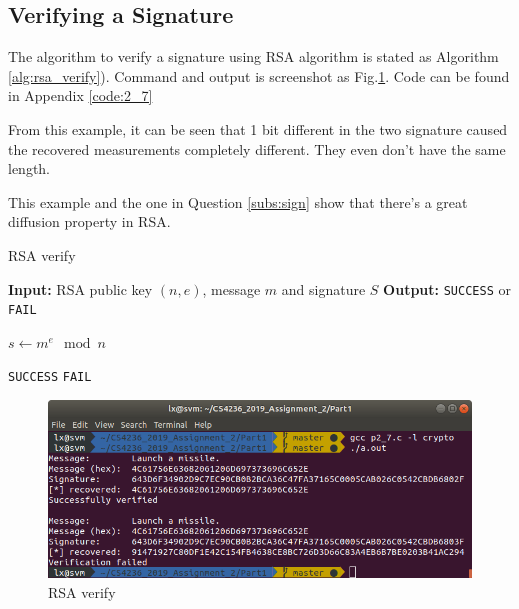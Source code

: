\subsection{Verifying a Signature}

The algorithm to verify a signature using RSA algorithm is stated as Algorithm \ref{alg:rsa_verify}).
Command and output is screenshot as Fig.\ref{fig:p2_7}.
Code can be found in Appendix \ref{code:2_7}

From this example, it can be seen that 1 bit different in the two signature caused the recovered measurements completely different. They even don't have the same length.

This example and the one in Question \ref{subs:sign} show that there's a great diffusion property in RSA.

\begin{algorithm}
\caption{RSA verify}
\label{alg:rsa_verify}
\begin{algorithmic}
\STATE \textbf{Input:} RSA public key $(n, e)$, message $m$ and signature $S$
\STATE \textbf{Output:} \texttt{SUCCESS} or \texttt{FAIL}

\STATE $ s \gets m^e \mod{n} $

    \RETURN \texttt{SUCCESS}
\ELSE
    \RETURN \texttt{FAIL}
\ENDIF 

\end{algorithmic}
\end{algorithm}

\begin{figure}[!t]
\centering
\includegraphics[width=\columnwidth]{pictures/p2_7.png}
\caption{
    RSA verify
}
\label{fig:p2_7}
\end{figure}